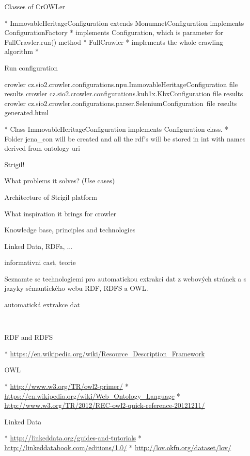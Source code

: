 \secc Classes of CrOWLer

\begitems
  * ImmovableHeritageConfiguration extends MonumnetConfiguration implements ConfigurationFactory 
  \begitems
    * implements Configuration, which is parameter for FullCrawler.run() method
  \enditems
  * FullCrawler
  \begitems
    * implements the whole crawling algorithm
    * 
  \enditems
\enditems

\secc Run configuration 

\begtt
crowler cz.sio2.crowler.configurations.npu.ImmovableHeritageConfiguration file results
crowler cz.sio2.crowler.configurations.kub1x.KbxConfiguration file results
crowler cz.sio2.crowler.configurations.parser.SeleniumConfiguration\
         file results generated.html
\endtt

\begitems
  * Class ImmovableHeritageConfiguration implements Configuration class. 
  * Folder jena\_con will be created and all the rdf's will be stored in int with names derived from ontology uri
\enditems



\sec Strigil!

\secc What problems it solves? (Use cases)

\secc Architecture of Strigil platform

\secc What inspiration it brings for crowler






\chap Knowledge base, principles and technologies

 Linked Data, RDFa, ...

informativni cast, teorie

Seznamte se technologiemi pro automatickou extrakci dat z webových stránek a s
jazyky sémantického webu RDF, RDFS a OWL.

\sec automatická extrakce dat

~

\sec RDF and RDFS

\begitems
 * \url{https://en.wikipedia.org/wiki/Resource_Description_Framework}
\enditems


\sec OWL

\begitems
 * \url{http://www.w3.org/TR/owl2-primer/}
 * \url{https://en.wikipedia.org/wiki/Web_Ontology_Language}
 * \url{http://www.w3.org/TR/2012/REC-owl2-quick-reference-20121211/}
\enditems


\sec Linked Data

\begitems
 * \url{http://linkeddata.org/guides-and-tutorials}
 * \url{http://linkeddatabook.com/editions/1.0/}
 * \url{http://lov.okfn.org/dataset/lov/}
\enditems


